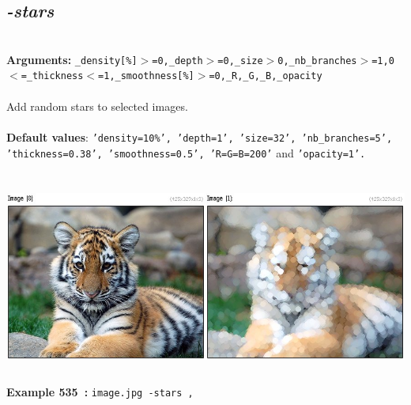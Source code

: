 \documentclass[a4paper,11pt,twoside]{book}
\begin{document}
\subsection{\emph{-stars} }\vspace*{-0.5em}
~\\\textbf{Arguments: } 
{\small \texttt{\_density[\%]$>$=0,\_depth$>$=0,\_size$>$0,\_nb\_branches$>$=1,0$<$=\_thickness$<$=1,\_smoothness[\%]$>$=0,\_R,\_G,\_B,\_opacity}}\\~\\
Add random stars to selected images.
~\\~\\\textbf{Default values}: {\small \texttt{'density=10\%', 'depth=1', 'size=32', 'nb\_branches=5', 'thickness=0.38', 'smoothness=0.5', 'R=G=B=200'} and \texttt{'opacity=1'.}}
\begin{center}\includegraphics[keepaspectratio=true,height=7cm,width=\textwidth]{img/gmic_def535.jpg}\\
{\footnotesize \textbf{Example 535~:} \texttt{image.jpg -stars ,}}
\end{center}
\end{document}
